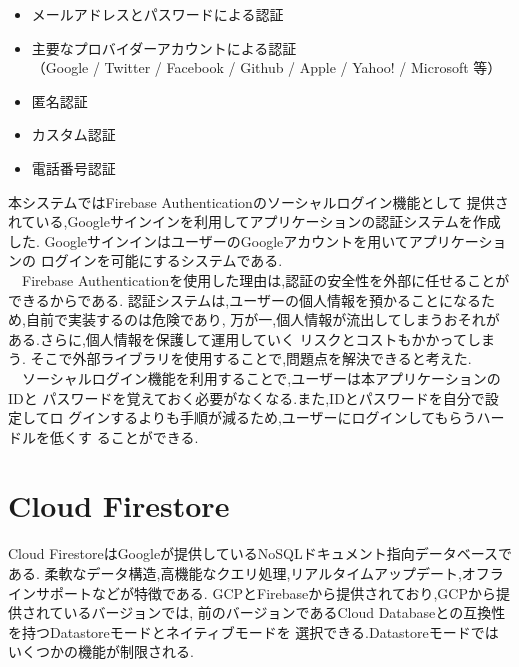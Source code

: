 \begin{itemize}
	\item メールアドレスとパスワードによる認証 \\

	\item 主要なプロバイダーアカウントによる認証 \\
	（Google / Twitter / Facebook / Github / Apple / Yahoo! / Microsoft 等） \\

	\item 匿名認証 \\

	\item カスタム認証 \\

	\item 電話番号認証 \\
\end{itemize}

本システムではFirebase Authenticationのソーシャルログイン機能として
提供されている,Googleサインインを利用してアプリケーションの認証システムを作成した. 
GoogleサインインはユーザーのGoogleアカウントを用いてアプリケーションの
ログインを可能にするシステムである. \\
　Firebase Authenticationを使用した理由は,認証の安全性を外部に任せることができるからである.
認証システムは,ユーザーの個人情報を預かることになるため,自前で実装するのは危険であり,
万が一,個人情報が流出してしまうおそれがある.さらに,個人情報を保護して運用していく
リスクとコストもかかってしまう.
そこで外部ライブラリを使用することで,問題点を解決できると考えた. \\
　ソーシャルログイン機能を利用することで,ユーザーは本アプリケーションのIDと
パスワードを覚えておく必要がなくなる.また,IDとパスワードを自分で設定してロ
グインするよりも手順が減るため,ユーザーにログインしてもらうハードルを低くす
ることができる. 

\clearpage

\section{Cloud Firestore}
\label{sec:reference_cloud}
Cloud FirestoreはGoogleが提供しているNoSQLドキュメント指向データベースである.
柔軟なデータ構造,高機能なクエリ処理,リアルタイムアップデート,オフラインサポートなどが特徴である.
GCPとFirebaseから提供されており,GCPから提供されているバージョンでは,
前のバージョンであるCloud Databaseとの互換性を持つDatastoreモードとネイティブモードを
選択できる.Datastoreモードではいくつかの機能が制限される. \\

